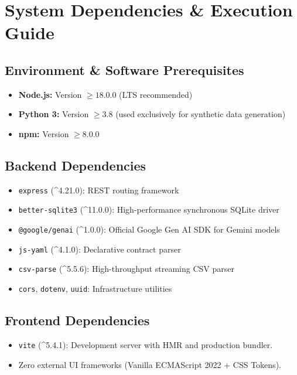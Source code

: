 \documentclass[11pt,a4paper]{article}
\begin{document}
\section{System Dependencies \& Execution Guide}

\subsection{Environment \& Software Prerequisites}
\begin{itemize}[noitemsep]
    \item \textbf{Node.js:} Version $\ge 18.0.0$ (LTS recommended)
    \item \textbf{Python 3:} Version $\ge 3.8$ (used exclusively for synthetic data generation)
    \item \textbf{npm:} Version $\ge 8.0.0$
\end{itemize}

\subsection{Backend Dependencies}
\begin{itemize}[noitemsep]
    \item \texttt{express} (\textasciicircum 4.21.0): REST routing framework
    \item \texttt{better-sqlite3} (\textasciicircum 11.0.0): High-performance synchronous SQLite driver
    \item \texttt{@google/genai} (\textasciicircum 1.0.0): Official Google Gen AI SDK for Gemini models
    \item \texttt{js-yaml} (\textasciicircum 4.1.0): Declarative contract parser
    \item \texttt{csv-parse} (\textasciicircum 5.5.6): High-throughput streaming CSV parser
    \item \texttt{cors}, \texttt{dotenv}, \texttt{uuid}: Infrastructure utilities
\end{itemize}

\subsection{Frontend Dependencies}
\begin{itemize}[noitemsep]
    \item \texttt{vite} (\textasciicircum 5.4.1): Development server with HMR and production bundler.
    \item Zero external UI frameworks (Vanilla ECMAScript 2022 + CSS Tokens).
\end{itemize}
\end{document}
